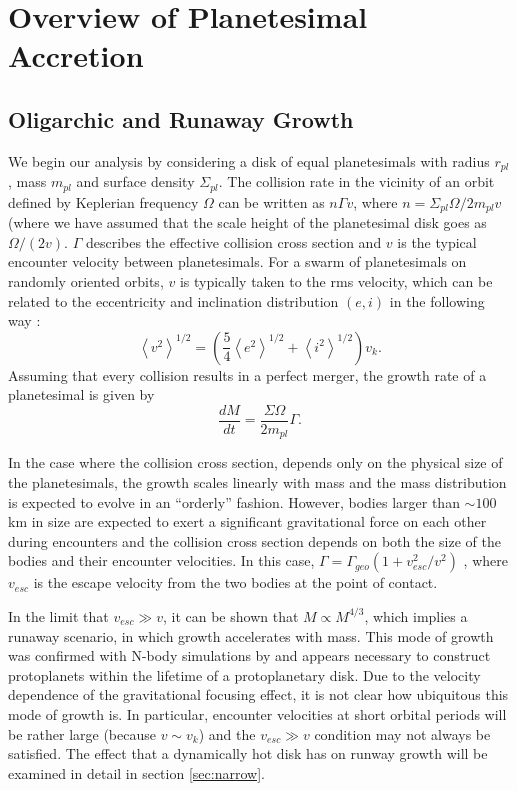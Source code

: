 \documentclass[twocolumn]{aastex63}
\begin{document}
\section{Overview of Planetesimal Accretion}\label{sec:theory}

\subsection{Oligarchic and Runaway Growth}

We begin our analysis by considering a disk of equal planetesimals
with radius $r_{pl}$, mass $m_{pl}$ and surface density
$\Sigma_{pl}$. The collision rate in the vicinity of an orbit defined
by Keplerian frequency $\Omega$ can be written as $n \Gamma v$, where
$n = \Sigma_{pl} \Omega / 2 m_{pl} v$ (where we have assumed that the scale height of the planetesimal disk goes as $\Omega/(2v)$. $\Gamma$ describes the effective
collision cross section and $v$ is the typical encounter velocity
between planetesimals.
For a swarm of planetesimals on randomly oriented orbits, $v$ is typically
taken to the rms velocity, which can be related to the eccentricity and inclination distribution $(e, i)$ in the following way \citep{lissauer93}:
\begin{equation}\label{eq:ecc_vel}
	\left< v^{2} \right>^{1/2} = \left( \frac{5}{4} \left< e^{2} \right>^{1/2} + \left< i^{2} \right>^{1/2}  \right) v_{k}.
\end{equation}
Assuming that every collision results in a perfect merger, the growth rate of a planetesimal is given by
\begin{equation}\label{eq:growth}
	\frac{dM}{dt} = \frac{\Sigma \Omega}{2 m_{pl}} \Gamma.
\end{equation}

In the case where the collision cross section, depends only
on the physical size of the planetesimals, the growth scales linearly
with mass and the mass distribution is expected to evolve in an
``orderly'' fashion. However, bodies larger than $\sim 100$ km in size are expected to exert a significant gravitational force on each other during encounters and the collision cross section depends on both the size of the bodies and their encounter velocities. In this case, $\Gamma = \Gamma_{geo} \left( 1 + v_{esc}^2 / v^2 \right)$ \citep{safronov69}, where $v_{esc}$ is the escape velocity from the two bodies at the point of contact.

In the limit that $v_{esc} \gg v$, it can be shown that $M \propto
M^{4/3}$, which implies a runaway scenario, in which growth
accelerates with mass. This mode of growth was confirmed with N-body
simulations by \citet{kokubo96} and appears necessary to construct
protoplanets within the lifetime of a protoplanetary disk. Due to the
velocity dependence of the gravitational focusing effect, it is not clear how ubiquitous this mode of growth is. In particular, encounter velocities at short orbital periods will be rather large (because $v \sim v_{k}$) and the $v_{esc} \gg v$ condition may not always be satisfied. The effect that a dynamically hot disk has on runway growth will be examined in detail in section \ref{sec:narrow}.
\end{document}
